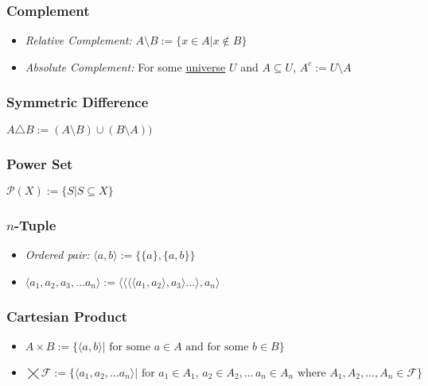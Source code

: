 \subsubsection{Complement}\label{complement}
\begin{itemize}
  \item \emph{Relative Complement:} $A \ensuremath{\setminus} B := \{x \in A | x \not\in B \}$
  \item \emph{Absolute Complement:} For some \hyperref[universe]{universe} $U$ and $A \subseteq U$, $A^{c} := U \ensuremath{\setminus} A$
\end{itemize}
	
\subsubsection{Symmetric Difference}\label{symmetricdifference}
$A \ensuremath{\triangle} B := (A \setminus B) \cup (B \setminus A))$
	
\subsubsection{Power Set}\label{powerset}
$\mathcal{P}(X) := \{S |S \subseteq X\}$
	
\subsubsection{$n$-Tuple}\label{tuble}
\begin{itemize}
  \item \emph{Ordered pair:} $\langle a,b \rangle := \{\{a\}, \{a,b\}\}$
  \item $\langle a_1,a_2,a_3,\dots a_n \rangle := \langle \langle \langle \langle a_1, a_2 \rangle, a_3 \rangle \dots \rangle, a_n\rangle$
\end{itemize}
		
\subsubsection{Cartesian Product}\label{cartesianproduct}
\begin{itemize}
  \item $A \times B := \{ \langle a,b \rangle | \textrm{ for some }a\in A \textrm{ and for some } b \in B\}$
  \item \mbox{$\bigtimes \mathcal{F} := \{ \langle a_1,a_2, \dots a_n \rangle | \textrm{ for }a_1\in A_1, \, a_2 \in A_2, \dots \, a_n \in A_n \textrm{ where } A_1,A_2,\dots,A_n \in \mathcal{F}\}$}
\end{itemize}
			
